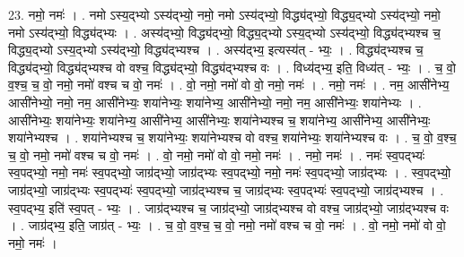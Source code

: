 \documentclass[17pt]{extarticle}
\begin{document}
23. नमो॒ नमः॑ । . नमो ऽस्य॒द्भ्यो ऽस्य॑द्भ्यो॒ नमो॒ नमो ऽस्य॑द्भ्यो॒ विद्ध्य॑द्भ्यो॒ विद्ध्य॒द्भ्यो ऽस्य॑द्भ्यो॒ नमो॒ नमो ऽस्य॑द्भ्यो॒ विद्ध्य॑द्भ्यः । . अस्य॑द्भ्यो॒ विद्ध्य॑द्भ्यो॒ विद्ध्य॒द्भ्यो ऽस्य॒द्भ्यो ऽस्य॑द्भ्यो॒ विद्ध्य॑द्भ्यश्च च॒ विद्ध्य॒द्भ्यो ऽस्य॒द्भ्यो ऽस्य॑द्भ्यो॒ विद्ध्य॑द्भ्यश्च । . अस्य॑द्भ्य॒ इत्यस्य॑त् - भ्यः॒ । . विद्ध्य॑द्भ्यश्च च॒ विद्ध्य॑द्भ्यो॒ विद्ध्य॑द्भ्यश्च वो वश्च॒ विद्ध्य॑द्भ्यो॒ विद्ध्य॑द्भ्यश्च वः । . विध्य॑द्भ्य॒ इति॒ विध्य॑त् - भ्यः॒ । . च॒ वो॒ व॒श्च॒ च॒ वो॒ नमो॒ नमो॑ वश्च च वो॒ नमः॑ । . वो॒ नमो॒ नमो॑ वो वो॒ नमो॒ नमः॑ । . नमो॒ नमः॑ । . नम॒ आसी॑नेभ्य॒ आसी॑नेभ्यो॒ नमो॒ नम॒ आसी॑नेभ्यः॒ शया॑नेभ्यः॒ शया॑नेभ्य॒ आसी॑नेभ्यो॒ नमो॒ नम॒ आसी॑नेभ्यः॒ शया॑नेभ्यः । . आसी॑नेभ्यः॒ शया॑नेभ्यः॒ शया॑नेभ्य॒ आसी॑नेभ्य॒ आसी॑नेभ्यः॒ शया॑नेभ्यश्च च॒ शया॑नेभ्य॒ आसी॑नेभ्य॒ आसी॑नेभ्यः॒ शया॑नेभ्यश्च । . शया॑नेभ्यश्च च॒ शया॑नेभ्यः॒ शया॑नेभ्यश्च वो वश्च॒ शया॑नेभ्यः॒ शया॑नेभ्यश्च वः । . च॒ वो॒ व॒श्च॒ च॒ वो॒ नमो॒ नमो॑ वश्च च वो॒ नमः॑ । . वो॒ नमो॒ नमो॑ वो वो॒ नमो॒ नमः॑ । . नमो॒ नमः॑ । . नमः॑ स्व॒पद्भ्यः॑ स्व॒पद्भ्यो॒ नमो॒ नमः॑ स्व॒पद्भ्यो॒ जाग्र॑द्भ्यो॒ जाग्र॑द्भ्यः स्व॒पद्भ्यो॒ नमो॒ नमः॑ स्व॒पद्भ्यो॒ जाग्र॑द्भ्यः । . स्व॒पद्भ्यो॒ जाग्र॑द्भ्यो॒ जाग्र॑द्भ्यः स्व॒पद्भ्यः॑ स्व॒पद्भ्यो॒ जाग्र॑द्भ्यश्च च॒ जाग्र॑द्भ्यः स्व॒पद्भ्यः॑ स्व॒पद्भ्यो॒ जाग्र॑द्भ्यश्च । . स्व॒पद्भ्य॒ इति॑ स्व॒पत् - भ्यः॒ । . जाग्र॑द्भ्यश्च च॒ जाग्र॑द्भ्यो॒ जाग्र॑द्भ्यश्च वो वश्च॒ जाग्र॑द्भ्यो॒ जाग्र॑द्भ्यश्च वः । . जाग्र॑द्भ्य॒ इति॒ जाग्र॑त् - भ्यः॒ । . च॒ वो॒ व॒श्च॒ च॒ वो॒ नमो॒ नमो॑ वश्च च वो॒ नमः॑ । . वो॒ नमो॒ नमो॑ वो वो॒ नमो॒ नमः॑ । \newline
\end{document}
